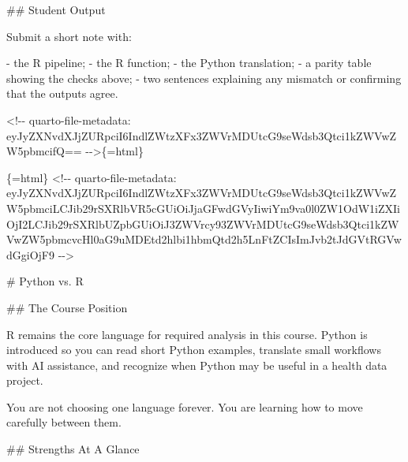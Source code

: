 \documentclass[
  letterpaper,
  DIV=11,
  numbers=noendperiod,
  oneside]{scrreprt}
\newenvironment{Shaded}{\begin{snugshade}}{\end{snugshade}}
\newcommand{\FunctionTok}[1]{\textcolor[rgb]{0.28,0.35,0.67}{#1}}
\newcommand{\InformationTok}[1]{\textcolor[rgb]{0.37,0.37,0.37}{#1}}
\newcommand{\NormalTok}[1]{\textcolor[rgb]{0.00,0.23,0.31}{#1}}
\newcommand{\SpecialStringTok}[1]{\textcolor[rgb]{0.13,0.47,0.30}{#1}}
\begin{document}
\begin{Shaded}
\begin{Highlighting}[numbers=left,,]
\FunctionTok{\#\# Student Output}

\NormalTok{Submit a short note with:}

\SpecialStringTok{{-} }\NormalTok{the R pipeline;}
\SpecialStringTok{{-} }\NormalTok{the R function;}
\SpecialStringTok{{-} }\NormalTok{the Python translation;}
\SpecialStringTok{{-} }\NormalTok{a parity table showing the checks above;}
\SpecialStringTok{{-} }\NormalTok{two sentences explaining any mismatch or confirming that the outputs agree.}


\InformationTok{\textasciigrave{}\textless{}!{-}{-} quarto{-}file{-}metadata: eyJyZXNvdXJjZURpciI6IndlZWtzXFx3ZWVrMDUtcG9seWdsb3Qtci1kZWVwZW5pbmcifQ== {-}{-}\textgreater{}\textasciigrave{}}\NormalTok{\{=html\}}

\InformationTok{\textasciigrave{}\textasciigrave{}\textasciigrave{}\{=html\}}
\InformationTok{\textless{}!{-}{-} quarto{-}file{-}metadata: eyJyZXNvdXJjZURpciI6IndlZWtzXFx3ZWVrMDUtcG9seWdsb3Qtci1kZWVwZW5pbmciLCJib29rSXRlbVR5cGUiOiJjaGFwdGVyIiwiYm9va0l0ZW1OdW1iZXIiOjI2LCJib29rSXRlbUZpbGUiOiJ3ZWVrcy93ZWVrMDUtcG9seWdsb3Qtci1kZWVwZW5pbmcvcHl0aG9uMDEtd2hlbi1hbmQtd2h5LnFtZCIsImJvb2tJdGVtRGVwdGgiOjF9 {-}{-}\textgreater{}}
\InformationTok{\textasciigrave{}\textasciigrave{}\textasciigrave{}}

\FunctionTok{\# Python vs. R }


\FunctionTok{\#\# The Course Position}

\NormalTok{R remains the core language for required analysis in this course. Python is introduced so you can read short Python examples, translate small workflows with AI assistance, and recognize when Python may be useful in a health data project.}

\NormalTok{You are not choosing one language forever. You are learning how to move carefully between them.}

\FunctionTok{\#\# Strengths At A Glance}


\end{Highlighting}
\end{Shaded}
\end{document}
